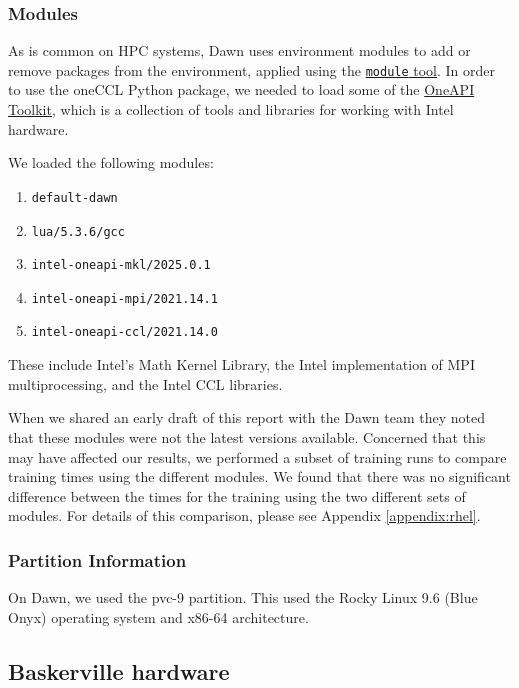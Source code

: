 \subsubsection{Modules}

As is common on HPC systems, Dawn uses environment modules to add or remove packages from the environment, applied using the \href{https://hpc-wiki.info/hpc/index.php?title=Modules&oldid=5007}{{\tt module} tool}. In order to use the oneCCL Python package, we needed to load some of the \href{https://www.intel.com/content/www/us/en/developer/tools/oneapi/base-toolkit.html#gs.mqrwie}{OneAPI Toolkit}, which is a collection of tools and libraries for working with Intel hardware.

We loaded the following modules:
\begin{enumerate}
    \item {\tt default-dawn}
    \item {\tt lua/5.3.6/gcc}
    \item {\tt intel-oneapi-mkl/2025.0.1}
    \item {\tt intel-oneapi-mpi/2021.14.1}
    \item {\tt intel-oneapi-ccl/2021.14.0}
\end{enumerate}

These include Intel's Math Kernel Library, the Intel implementation of MPI multiprocessing, and the Intel CCL libraries.

When we shared an early draft of this report with the Dawn team they noted that these modules were not the latest versions available. Concerned that this may have affected our results, we performed a subset of training runs to compare training times using the different modules. We found that there was no significant difference between the times for the training using the two different sets of modules. For details of this comparison, please see Appendix \ref{appendix:rhel}.

\subsubsection{Partition Information}

On Dawn, we used the pvc-9 partition. This used the Rocky Linux 9.6 (Blue Onyx) operating system and x86-64 architecture.

\subsection{Baskerville hardware}


